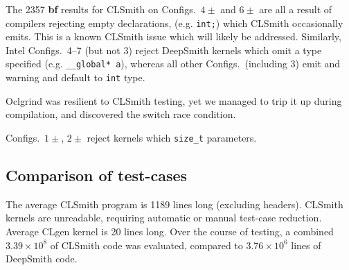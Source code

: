 
The 2357 \textbf{bf} results for CLSmith on Configs.\ $4\pm$ and $6\pm$ are all a result of compilers rejecting empty declarations, (e.g. \texttt{int;}) which CLSmith occasionally emits. This is a known CLSmith issue which will likely be addressed.
Similarly, Intel Configs.\ 4--7 (but not 3) reject DeepSmith kernels which omit a type specified (e.g. \texttt{\_\_global* a}), whereas all other Configs.\ (including 3) emit and warning and default to \texttt{int} type.


Oclgrind was resilient to CLSmith testing, yet we managed to trip it up during compilation, and discovered the switch race condition.

Configs.\ $1\pm$, $2\pm$ reject kernels which \texttt{size\_t} parameters.


\subsection{Comparison of test-cases}

The average CLSmith program is 1189 lines long (excluding headers). CLSmith kernels are unreadable, requiring automatic or manual test-case reduction.
Average CLgen kernel is 20 lines long.
Over the course of testing, a combined $3.39 \times 10^8$ of CLSmith code was evaluated, compared to $3.76 \times 10^6$ lines of DeepSmith code.

